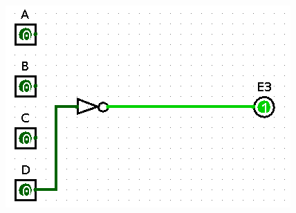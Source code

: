 \documentclass{article}
\begin{document}
\begin{center}
    \includegraphics[scale=0.2]{sc3.png}
\end{center}
\newpage
\end{document}
